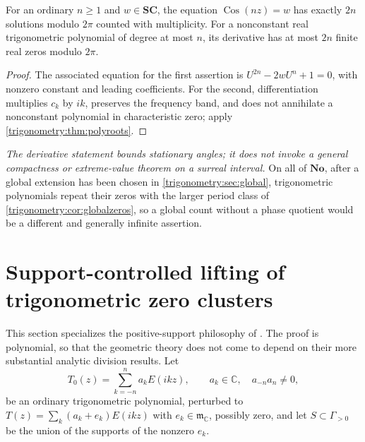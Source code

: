 \documentclass[11pt,letterpaper]{article}
\numberwithin{equation}{section}
\theoremstyle{definition}
\theoremstyle{remark}
\newcommand{\No}{\mathbf{No}}
\newcommand{\SC}{\mathbf{SC}}
\newcommand{\C}{\mathbb C}
\newcommand{\mm}{\mathfrak m}
\newcommand{\Cos}{\operatorname{Cos}}
\begin{document}
\begin{corollary}\label{trigonometry:cor:chebyshev}
For an ordinary $n\ge1$ and $w\in\SC$, the equation $\Cos(nz)=w$ has exactly $2n$ solutions modulo
$2\pi$ counted with multiplicity. For a nonconstant real trigonometric polynomial of degree at most
$n$, its derivative has at most $2n$ finite real zeros modulo $2\pi$.
\end{corollary}
\begin{proof}
The associated equation for the first assertion is $U^{2n}-2wU^n+1=0$, with nonzero constant and
leading coefficients. For the second, differentiation multiplies $c_k$ by $ik$, preserves the
frequency band, and does not annihilate a nonconstant polynomial in characteristic zero; apply
\cref{trigonometry:thm:polyroots}.
\end{proof}
\emph{The derivative statement bounds stationary angles; it does not invoke a general compactness
or extreme-value theorem on a surreal interval.} On all of $\No$, after a global extension has been
chosen in \cref{trigonometry:sec:global}, trigonometric polynomials repeat their zeros with the
larger period class of \cref{trigonometry:cor:globalzeros}, so a global count without a phase
quotient would be a different and generally infinite assertion.

\section{Support-controlled lifting of trigonometric zero clusters}
\label{trigonometry:sec:clusters}

This section specializes the positive-support philosophy of
\cite{SourceGeometry,SourceIntersections}. The proof is polynomial, so that the geometric theory
does not come to depend on their more substantial analytic division results. Let
\[
 T_0(z)=\sum_{k=-n}^na_kE(ikz),\qquad a_k\in\C,\quad a_{-n}a_n\ne0,
\]
be an ordinary trigonometric polynomial, perturbed to
$T(z)=\sum_k(a_k+e_k)E(ikz)$ with $e_k\in\mm_{\C}$, possibly zero, and let
$S\subset\Gamma_{>0}$ be the union of the supports of the nonzero $e_k$.
\end{document}

